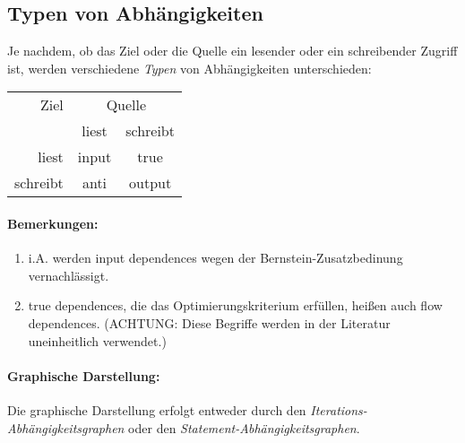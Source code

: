 \subsection{Typen von Abhängigkeiten}
Je nachdem, ob das Ziel oder die Quelle ein lesender oder ein schreibender Zugriff ist, werden verschiedene \emph{Typen} von Abhängigkeiten unterschieden:

\begin{center}
\begin{tabular}{||r|cc||}
\hline
Ziel & \multicolumn{2}{|c||}{Quelle}\\
 & liest & schreibt \\
\hline
liest & input & true\\
schreibt & anti & output\\
\hline
\end{tabular}
\end{center}

\paragraph{Bemerkungen:}
\begin{enumerate}
\item i.A. werden input dependences wegen der Bernstein-Zusatzbedinung
  vernachlässigt.
\item true dependences, die das Optimierungskriterium erfüllen, heißen auch flow dependences.
  (ACHTUNG: Diese Begriffe werden in der Literatur uneinheitlich verwendet.)
\end{enumerate}

\paragraph{Graphische Darstellung:}
Die graphische Darstellung erfolgt entweder durch den
\emph{Iterations-Abhängigkeitsgraphen} oder den
\emph{Statement-Abhängigkeitsgraphen}.
